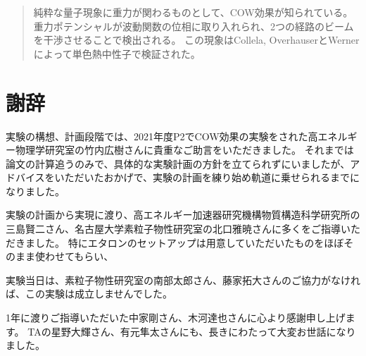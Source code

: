 \documentclass[dvipdfmx]{jsarticle}
\begin{document}
\maketitle


\begin{abstract}
    純粋な量子現象に重力が関わるものとして、COW効果が知られている。
    \cite{COWtheory}
    重力ポテンシャルが波動関数の位相に取り入れられ、2つの経路のビームを干渉させることで検出される。
    この現象はCollela, OverhauserとWernerによって単色熱中性子で検証された。
    \cite{COWexp}
\end{abstract}





\section*{謝辞}

実験の構想、計画段階では、2021年度P2でCOW効果の実験\cite{report2021}をされた高エネルギー物理学研究室の竹内広樹さんに貴重なご助言をいただきました。
それまでは論文の計算追うのみで、具体的な実験計画の方針を立てられずにいましたが、アドバイスをいただいたおかげで、実験の計画を練り始め軌道に乗せられるまでになりました。

実験の計画から実現に渡り、高エネルギー加速器研究機構物質構造科学研究所の三島賢二さん、名古屋大学素粒子物性研究室の北口雅暁さんに多くをご指導いただきました。
特にエタロンのセットアップは用意していただいたものをほぼそのまま使わせてもらい、


実験当日は、素粒子物性研究室の南部太郎さん、藤家拓大さんのご協力がなければ、この実験は成立しませんでした。


1年に渡りご指導いただいた中家剛さん、木河達也さんに心より感謝申し上げます。
TAの星野大輝さん、有元隼太さんにも、長きにわたって大変お世話になりました。




\end{document}
